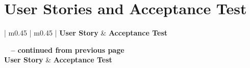 
\chapter{User Stories and Acceptance Test}
\label{app:user_stories_and_acceptance_test}


\begin{center}
\begin{longtable}{| m{} | m{} |}
\hline
  \textbf{User Story}
& \textbf{Acceptance Test} \\ \hline
\endfirsthead

%
{{\bfseries \tablename\ \thetable{} -- continued from previous page}} \\
\hline
  \textbf{User Story}
& \textbf{Acceptance Test} \\ \hline
\endhead

\hline {} \\ \hline
\endfoot
\endlastfoot


\end{longtable}
\end{center}
